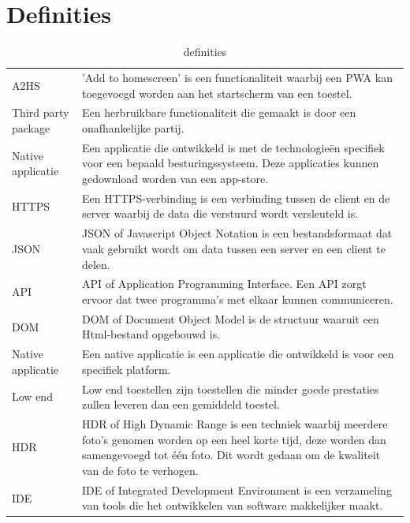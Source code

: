 \documentclass{bachproef-tin}
\begin{document}
\chapter*{Definities}
\begin{table}[H]
	\begin{tabular}{p{3cm}p{10cm}}
		A2HS & 'Add to homescreen' is een functionaliteit waarbij een PWA kan toegevoegd worden aan het startscherm van een toestel.\\
		Third party package & Een herbruikbare functionaliteit die gemaakt is door een onafhankelijke partij.\\
		Native applicatie & Een applicatie die ontwikkeld is met de technologieën specifiek voor een bepaald besturingssysteem. Deze applicaties kunnen gedownload worden van een app-store.\\
		HTTPS & Een HTTPS-verbinding is een verbinding tussen de client en de server waarbij de data die verstuurd wordt versleuteld is. \\
		JSON &  JSON of Javascript Object Notation is een bestandsformaat dat vaak gebruikt wordt om data tussen een server en een client te delen. \\
		API &  API of Application Programming Interface. Een API zorgt ervoor dat twee programma’s met elkaar kunnen communiceren.\\
		DOM & DOM of Document Object Model is de structuur waaruit een Html-bestand opgebouwd is. \\
		Native applicatie &  Een native applicatie is een applicatie die ontwikkeld is voor een specifiek platform.\\
		Low end & Low end toestellen zijn toestellen die minder goede prestaties zullen leveren dan een gemiddeld toestel. \\
		HDR & HDR of High Dynamic Range is een techniek waarbij meerdere foto’s genomen worden op een heel korte tijd, deze worden dan samengevoegd tot één foto. Dit wordt gedaan om de kwaliteit van de foto te verhogen. \\
		IDE & IDE of Integrated Development Environment is een verzameling van tools die het ontwikkelen van software makkelijker maakt.
	\end{tabular}	
	\caption{definities }
\end{table}
\newpage


\end{document}
